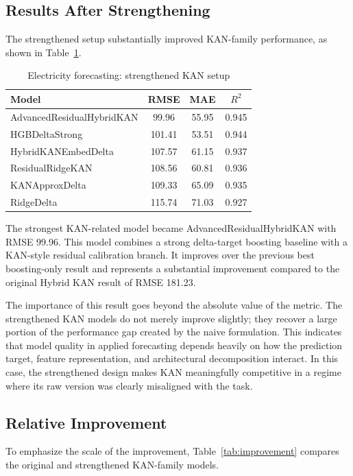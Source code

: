 \documentclass[10pt,conference,onecolumn]{IEEEtran}
\begin{document}
\subsection{Results After Strengthening}

The strengthened setup substantially improved KAN-family performance, as shown in Table~\ref{tab:elec_strong}.

\begin{table}[t]
\centering
\caption{Electricity forecasting: strengthened KAN setup}
\label{tab:elec_strong}
\small
\begin{tabular}{lccc}
\toprule
Model & RMSE & MAE & $R^2$ \\
\midrule
AdvancedResidualHybridKAN & 99.96 & 55.95 & 0.945 \\
HGBDeltaStrong & 101.41 & 53.51 & 0.944 \\
HybridKANEmbedDelta & 107.57 & 61.15 & 0.937 \\
ResidualRidgeKAN & 108.56 & 60.81 & 0.936 \\
KANApproxDelta & 109.33 & 65.09 & 0.935 \\
RidgeDelta & 115.74 & 71.03 & 0.927 \\
\bottomrule
\end{tabular}
\end{table}

The strongest KAN-related model became AdvancedResidualHybridKAN with RMSE 99.96. This model combines a strong delta-target boosting baseline with a KAN-style residual calibration branch. It improves over the previous best boosting-only result and represents a substantial improvement compared to the original Hybrid KAN result of RMSE 181.23.

The importance of this result goes beyond the absolute value of the metric. The strengthened KAN models do not merely improve slightly; they recover a large portion of the performance gap created by the naive formulation. This indicates that model quality in applied forecasting depends heavily on how the prediction target, feature representation, and architectural decomposition interact. In this case, the strengthened design makes KAN meaningfully competitive in a regime where its raw version was clearly misaligned with the task.

\subsection{Relative Improvement}

To emphasize the scale of the improvement, Table~\ref{tab:improvement} compares the original and strengthened KAN-family models.
\end{document}
